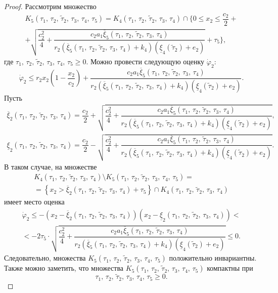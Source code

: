 \documentclass[14pt,a4paper]{extarticle}
\begin{document}
\begin{proof}
		Рассмотрим множество 
		\begin{multline*}
			K_5(\tau_1,\,\tau_2,\,\tilde{\tau}_2,\,\tau_3,\,\tau_4,\,\tau_5) = K_4(\tau_1,\,\tau_2,\,\tilde{\tau}_2,\,\tau_3,\,\tau_4)\cap \biggr\{0 \leqslant x_2 \leqslant \dfrac{c_2}{2}+\\
			+\sqrt{\dfrac{c_2^2}{4}+\dfrac{c_2a_1\overline{\xi}_5(\tau_1,\,\tau_2,\,\tilde{\tau}_2,\,\tau_3,\,\tau_4)}{r_2(\overline{\xi}_5(\tau_1,\,\tau_2,\,\tilde{\tau}_2,\,\tau_3,\,\tau_4)+k_4)(\underline{\xi}_4(\tilde{\tau}_2)+e_2)}}+\tau_5\biggr\},
		\end{multline*}
		где $\tau_1,\,\tau_2,\,\tilde{\tau}_2,\,\tau_3,\,\tau_4,\,\tau_5 \geqslant 0$.
		Можно провести следующую оценку $\dot{\varphi}_2$:
		\[\dot{\varphi}_2 \leqslant r_2x_2\left(1-\dfrac{x_2}{c_2}\right)+\dfrac{c_2a_1\overline{\xi}_5(\tau_1,\,\tau_2,\,\tilde{\tau}_2,\,\tau_3,\,\tau_4)}{r_2(\overline{\xi}_5(\tau_1,\,\tau_2,\,\tilde{\tau}_2,\,\tau_3,\,\tau_4)+k_4)(\underline{\xi}_4(\tilde{\tau}_2)+e_2)}.\]
		Пусть
		\begin{align*}
			\overline{\xi}_2(\tau_1,\,\tau_2,\,\tilde{\tau}_2,\,\tau_3,\,\tau_4) = \dfrac{c_2}{2}+\sqrt{\dfrac{c_2^2}{4}+\dfrac{c_2a_1\overline{\xi}_5(\tau_1,\,\tau_2,\,\tilde{\tau}_2,\,\tau_3,\,\tau_4)}{r_2(\overline{\xi}_5(\tau_1,\,\tau_2,\,\tilde{\tau}_2,\,\tau_3,\,\tau_4)+k_4)(\underline{\xi}_4(\tilde{\tau}_2)+e_2)}},\\
			\underline{\xi}_2(\tau_1,\,\tau_2,\,\tilde{\tau}_2,\,\tau_3,\,\tau_4) = \dfrac{c_2}{2}-\sqrt{\dfrac{c_2^2}{4}+\dfrac{c_2a_1\overline{\xi}_5(\tau_1,\,\tau_2,\,\tilde{\tau}_2,\,\tau_3,\,\tau_4)}{r_2(\overline{\xi}_5(\tau_1,\,\tau_2,\,\tilde{\tau}_2,\,\tau_3,\,\tau_4)+k_4)(\underline{\xi}_4(\tilde{\tau}_2)+e_2)}}.
		\end{align*}
		В таком случае, на множестве 
		\begin{multline*}
			K_4(\tau_1,\,\tau_2,\,\tilde{\tau}_2,\,\tau_3,\,\tau_4)\setminus K_5(\tau_1,\,\tau_2,\,\tilde{\tau}_2,\,\tau_3,\,\tau_4,\,\tau_5) =\\
			=\left\{x_2 > \overline{\xi}_2(\tau_1,\,\tau_2,\,\tilde{\tau}_2,\,\tau_3,\,\tau_4)+\tau_5\right\}\cap K_4(\tau_1,\,\tau_2,\,\tilde{\tau}_2,\,\tau_3,\,\tau_4)
		\end{multline*}
		имеет место оценка
		\begin{multline*}
			\dot{\varphi}_2 \leqslant -(x_2 - \overline{\xi}_2(\tau_1,\,\tau_2,\,\tilde{\tau}_2,\,\tau_3,\,\tau_4))(x_2 - \underline{\xi}_2(\tau_1,\,\tau_2,\,\tilde{\tau}_2,\,\tau_3,\,\tau_4)) <\\
			< -2\tau_5\cdot\sqrt{\dfrac{c_2^2}{4}+\dfrac{c_2a_1\overline{\xi}_5(\tau_1,\,\tau_2,\,\tilde{\tau}_2,\,\tau_3,\,\tau_4)}{r_2(\overline{\xi}_5(\tau_1,\,\tau_2,\,\tilde{\tau}_2,\,\tau_3,\,\tau_4)+k_4)(\underline{\xi}_4(\tilde{\tau}_2)+e_2)}} \leqslant 0.
		\end{multline*}
		Следовательно, множества $K_5(\tau_1,\,\tau_2,\,\tilde{\tau}_2,\,\tau_3,\,\tau_4,\,\tau_5)$ положительно инвариантны. Также можно заметить, что множества $K_5(\tau_1,\,\tau_2,\,\tilde{\tau}_2,\,\tau_3,\,\tau_4,\,\tau_5)$ компактны при
		\[\tau_1,\,\tau_2,\,\tilde{\tau}_2,\,\tau_3,\,\tau_4,\,\tau_5 \geqslant 0.\]
		

\end{proof}
\end{document}
